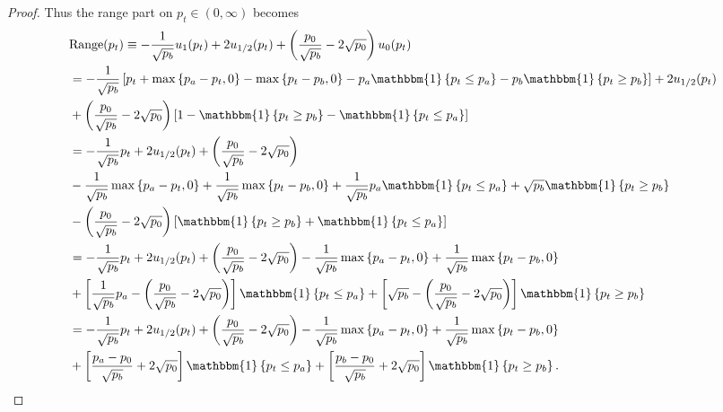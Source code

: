 \documentclass[pdftex,11pt,a4paper] {article}
\begin{document}
\begin{proof}
Thus the range part on $p_{t}\in(0, \infty)$ becomes
\begin{equation} \label{eq:ilf7a}
\begin{split}
& \mathrm{Range}(p_{t})  \equiv - \frac{1}{\sqrt{p_{b}}}u_{1}(p_{t}) + 2u_{1/2}(p_{t}) + \left(\frac{p_{0}}{\sqrt{p_{b}}}-2\sqrt{p_{0}}\right)u_{0}(p_{t})\\
& = - \frac{1}{\sqrt{p_{b}}} \left[p_{t} + \max\left\{ p_{a}-p_{t}, 0\right\} - \max\left\{ p_{t}-p_{b}, 0\right\} - p_{a}\mathbbm{1}\left\{p_{t}\leq p_{a}\right\} - p_{b}\mathbbm{1}\left\{p_{t} \geq p_{b}\right\}\right] + 2u_{1/2}(p_{t})\\
& + \left(\frac{p_{0}}{\sqrt{p_{b}}}-2\sqrt{p_{0}}\right) \left[1 - \mathbbm{1}\left\{p_{t} \geq p_{b}\right\} - \mathbbm{1}\left\{p_{t}\leq p_{a}\right\} \right]\\
& = - \frac{1}{\sqrt{p_{b}}} p_{t} + 2u_{1/2}(p_{t})+ \left(\frac{p_{0}}{\sqrt{p_{b}}}-2\sqrt{p_{0}}\right)  \\
& - \frac{1}{\sqrt{p_{b}}} \max\left\{ p_{a}-p_{t}, 0\right\} + \frac{1}{\sqrt{p_{b}}} \max\left\{ p_{t}-p_{b}, 0\right\} + \frac{1}{\sqrt{p_{b}}}p_{a}\mathbbm{1}\left\{p_{t}\leq p_{a}\right\} + \sqrt{p_{b}}\mathbbm{1}\left\{p_{t} \geq p_{b}\right\}\\
& - \left(\frac{p_{0}}{\sqrt{p_{b}}}-2\sqrt{p_{0}}\right) \left[\mathbbm{1}\left\{p_{t} \geq p_{b}\right\} + \mathbbm{1}\left\{p_{t}\leq p_{a}\right\} \right] \\
& = - \frac{1}{\sqrt{p_{b}}} p_{t} + 2u_{1/2}(p_{t})+ \left(\frac{p_{0}}{\sqrt{p_{b}}}-2\sqrt{p_{0}}\right)  - \frac{1}{\sqrt{p_{b}}} \max\left\{ p_{a}-p_{t}, 0\right\} + \frac{1}{\sqrt{p_{b}}} \max\left\{ p_{t}-p_{b}, 0\right\} \\
& + \left[ \frac{1}{\sqrt{p_{b}}}p_{a}   - \left(\frac{p_{0}}{\sqrt{p_{b}}}-2\sqrt{p_{0}}\right)   \right]\mathbbm{1}\left\{p_{t}\leq p_{a}\right\} + \left[\sqrt{p_{b}}-\left(\frac{p_{0}}{\sqrt{p_{b}}}-2\sqrt{p_{0}}\right) \right]\mathbbm{1}\left\{p_{t} \geq p_{b}\right\}\\
&  = - \frac{1}{\sqrt{p_{b}}} p_{t} + 2u_{1/2}(p_{t})+ \left(\frac{p_{0}}{\sqrt{p_{b}}}-2\sqrt{p_{0}}\right)  - \frac{1}{\sqrt{p_{b}}} \max\left\{ p_{a}-p_{t}, 0\right\} + \frac{1}{\sqrt{p_{b}}} \max\left\{ p_{t}-p_{b}, 0\right\} \\
& + \left[ \frac{p_{a}-p_{0}}{\sqrt{p_{b}}}  + 2\sqrt{p_{0}}  \right]\mathbbm{1}\left\{p_{t}\leq p_{a}\right\} + \left[\frac{p_{b}-p_{0}}{\sqrt{p_{b}}}+2\sqrt{p_{0}} \right]\mathbbm{1}\left\{p_{t} \geq p_{b}\right\}.
\end{split}
\end{equation}




\end{proof}
\end{document}
